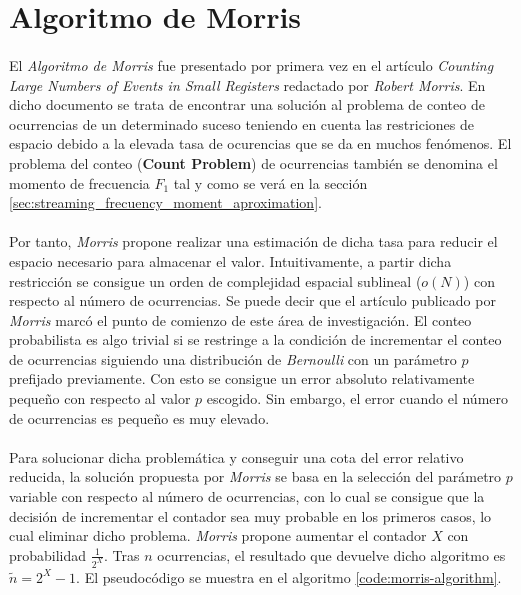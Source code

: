 \documentclass{subfiles}
\begin{document}
    \section{Algoritmo de Morris}
    \label{sec:streaming_morris_algorithm}

      \paragraph{}
      El \emph{Algoritmo de Morris} fue presentado por primera vez en el artículo \emph{Counting Large Numbers of Events in Small Registers} \cite{morris1978counting} redactado por \emph{Robert Morris}. En dicho documento se trata de encontrar una solución al problema de conteo de ocurrencias de un determinado suceso teniendo en cuenta las restriciones de espacio debido a la elevada tasa de ocurencias que se da en muchos fenómenos. El problema del conteo (\textbf{Count Problem}) de ocurrencias también se denomina el momento de frecuencia $F_1$ tal y como se verá en la sección \ref{sec:streaming_frecuency_moment_aproximation}.

      \paragraph{}
      Por tanto, \emph{Morris} propone realizar una estimación de dicha tasa para reducir el espacio necesario para almacenar el valor. Intuitivamente, a partir dicha restricción se consigue un orden de complejidad espacial sublineal ($o(N)$) con respecto al número de ocurrencias. Se puede decir que el artículo publicado por \emph{Morris} marcó el punto de comienzo de este área de investigación. El conteo probabilista es algo trivial si se restringe a la condición de incrementar el conteo de ocurrencias siguiendo una distribución de \emph{Bernoulli} con un parámetro $p$ prefijado previamente. Con esto se consigue un error absoluto relativamente pequeño con respecto al valor $p$ escogido. Sin embargo, el error cuando el número de ocurrencias es pequeño es muy elevado.


      \paragraph{}
      Para solucionar dicha problemática y conseguir una cota del error relativo reducida, la solución propuesta por \emph{Morris} se basa en la selección del parámetro $p$ variable con respecto al número de ocurrencias, con lo cual se consigue que la decisión de incrementar el contador sea muy probable en los primeros casos, lo cual eliminar dicho problema. \emph{Morris} propone aumentar el contador $X$ con probabilidad $\frac{1}{2^X}$. Tras $n$ ocurrencias, el resultado que devuelve dicho algoritmo es $\widetilde{n} = 2^X -1$. El pseudocódigo se muestra en el algoritmo \ref{code:morris-algorithm}.
\end{document}
